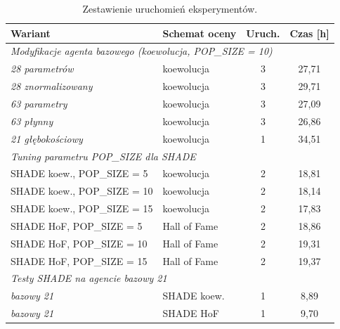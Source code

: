 \begin{table}[p]
\centering
\small
\caption{Zestawienie uruchomień eksperymentów.}
\label{tab:runs}
\begin{tabular}{llcc}
\toprule
Wariant & Schemat oceny & Uruch. & Czas [h] \\
\midrule
\multicolumn{4}{l}{\textit{Modyfikacje agenta bazowego (koewolucja, POP\_SIZE = 10)}} \\
\hspace{1em}\textit{28 parametrów}      & koewolucja & 3 & 27,71 \\
\hspace{1em}\textit{28 znormalizowany}  & koewolucja & 3 & 29,71 \\
\hspace{1em}\textit{63 parametry}       & koewolucja & 3 & 27,09 \\
\hspace{1em}\textit{63 płynny}          & koewolucja & 3 & 26,86 \\
\hspace{1em}\textit{21 głębokościowy}   & koewolucja & 1 & 34{,}51 \\
\midrule
\multicolumn{4}{l}{\textit{Tuning parametru POP\_SIZE dla SHADE}} \\
\hspace{1em}SHADE koew., POP\_SIZE = 5    & koewolucja   & 2 & 18,81 \\
\hspace{1em}SHADE koew., POP\_SIZE = 10   & koewolucja   & 2 & 18,14 \\
\hspace{1em}SHADE koew., POP\_SIZE = 15   & koewolucja   & 2 & 17,83 \\
\hspace{1em}SHADE HoF, POP\_SIZE = 5      & Hall of Fame & 2 & 18,86 \\
\hspace{1em}SHADE HoF, POP\_SIZE = 10     & Hall of Fame & 2 & 19,31 \\
\hspace{1em}SHADE HoF, POP\_SIZE = 15     & Hall of Fame & 2 & 19,37 \\
\midrule
\multicolumn{4}{l}{\textit{Testy SHADE na agencie bazowy 21}} \\
\hspace{1em}\textit{bazowy 21}        & SHADE koew.  & 1 & 8{,}89 \\
\hspace{1em}\textit{bazowy 21}        & SHADE HoF    & 1 & 9{,}70 \\

\end{tabular}
\end{table}
